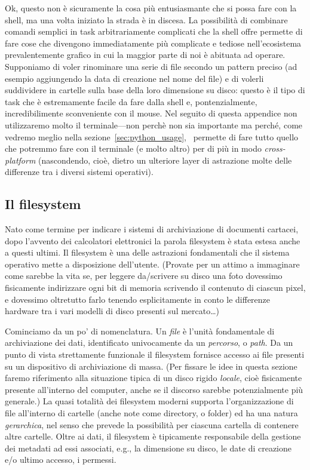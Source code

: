 Ok, questo non \`e sicuramente la cosa pi\`u entusiasmante che si possa fare con
la shell, ma una volta iniziato la strada \`e in discesa. La possibilit\`a di combinare
comandi semplici in task arbitrariamente complicati che la shell offre permette di
fare cose che divengono immediatamente pi\`u complicate e tediose nell'ecosistema
prevalentemente grafico in cui la maggior parte di noi \`e abituata ad operare.
Supponiamo di voler rinominare una serie di file secondo un pattern preciso (ad esempio
aggiungendo la data di creazione nel nome del file) e di volerli suddividere in
cartelle sulla base della loro dimensione su disco: questo \`e il tipo di task che
\`e estremamente facile da fare dalla shell e, pontenzialmente, incredibilimente
sconveniente con il mouse. Nel seguito di questa appendice non utilizzaremo molto
il terminale---non perch\`e non sia importante ma perch\'e, come vedremo meglio nella
sezione~\ref{sec:python_usage}, \python\ permette di fare tutto quello che potremmo
fare con il terminale (e molto altro) per di pi\`u in modo \emph{cross-platform}
(nascondendo, cio\`e, dietro un ulteriore layer di astrazione molte delle differenze
tra i diversi sistemi operativi).


\subsection{Il filesystem}

Nato come termine per indicare i sistemi di archiviazione di documenti cartacei,
dopo l'avvento dei calcolatori elettronici la parola filesystem \`e stata estesa
anche a questi ultimi. Il filesystem \`e una delle astrazioni fondamentali che il
sistema operativo mette a disposizione dell'utente. (Provate per un attimo a immaginare
come sarebbe la vita se, per leggere da/scrivere su disco una foto dovessimo fisicamente
indirizzare ogni bit di memoria scrivendo il contenuto di ciascun pixel, e dovessimo
oltretutto farlo tenendo esplicitamente in conto le differenze hardware tra i vari
modelli di disco presenti sul mercato\ldots)

Cominciamo da un po' di nomenclatura. Un \emph{file} \`e l'unit\`a fondamentale
di archiviazione dei dati, identificato univocamente da un \emph{percorso}, o \emph{path}.
Da un punto di vista strettamente funzionale il filesystem fornisce accesso ai file
presenti su un dispositivo di archiviazione di massa.
(Per fissare le idee in questa sezione faremo riferimento alla situazione tipica
di un disco rigido \emph{locale}, cio\`e fisicamente presente all'interno del computer,
anche se il discorso sarebbe potenzialmente pi\`u generale.)
La quasi totalit\`a dei filesystem moderni supporta l'organizzazione di file all'interno
di cartelle (anche note come directory, o folder) ed ha una natura \emph{gerarchica},
nel senso che prevede la possibilit\`a per ciascuna cartella di contenere altre
cartelle.
Oltre ai dati, il filesystem \`e tipicamente responsabile della gestione dei metadati
ad essi associati, e.g., la dimensione su disco, le date di creazione e/o ultimo
accesso, i permessi.


